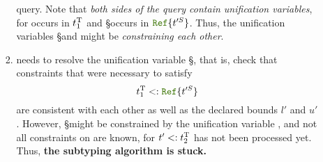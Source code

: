 \begin{enumerate}
\begin{enumerate}
\begin{enumerate}
            query. Note that \emph{both sides of the query contain
            unification variables}, for \T occurs in $t_1^{\mathrm{T}}$
            and \S occurs in $\reftyp{\t'^S}$.
            Thus, the unification variables \S and \T might
            be \emph{constraining each other}.
          \item\label{item:sub-stuck} \algo needs to resolve the unification variable \S, that is,
            check that constraints that were necessary to satisfy 
            \[ t_1^{\T} <: \reftyp{\t'^S} \]
            are consistent with each other as well as the declared bounds
            $l'$ and $u'$.
            However, \S might be constrained by the unification variable \T,
            and not all constraints on \T are known, for $t' <: t_2^{\mathrm{T}}$
            has not been processed yet.
            Thus, \textbf{the subtyping algorithm \algo is stuck.}
        \end{enumerate}
    \end{enumerate}
\end{enumerate}

